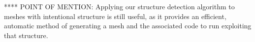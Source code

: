 






**** POINT OF MENTION:
Applying our structure detection algorithm to meshes with intentional structure is still useful, as it provides an efficient, automatic method of generating a mesh and the associated code to run exploiting that structure.
